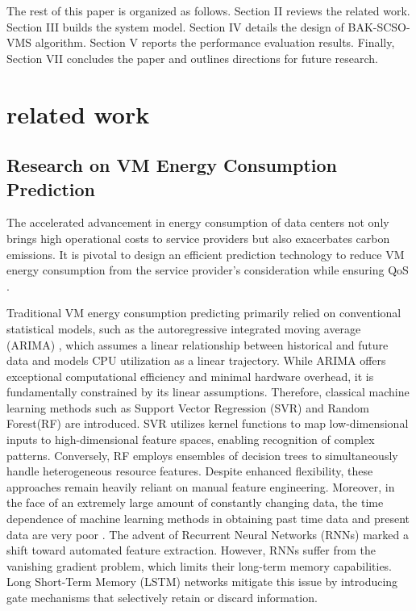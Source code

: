 \documentclass[conference]{{IEEEtran}}
\begin{document}
The rest of this paper is organized as follows. Section II reviews the related work. Section III builds the system model. Section IV details the design of BAK-SCSO-VMS algorithm. Section V reports the performance evaluation results. Finally, Section VII concludes the paper and outlines directions for future research.

\section{related work}
\subsection{Research on VM Energy Consumption Prediction}

The accelerated advancement in energy consumption of data centers not only brings high operational costs to service providers but also exacerbates carbon emissions. It is pivotal to design an efficient prediction technology to reduce VM energy consumption from the service provider’s consideration while ensuring QoS \cite{chua2024building}. 

Traditional VM energy consumption predicting primarily relied on conventional statistical models, such as the autoregressive integrated moving average (ARIMA) \cite{contreras2003arima}, which assumes a linear relationship between historical and future data and models CPU utilization as a linear trajectory. While ARIMA offers exceptional computational efficiency and minimal hardware overhead, it is fundamentally constrained by its linear assumptions. Therefore, classical machine learning methods such as Support Vector Regression (SVR) \cite{bertossi1999fault} and Random Forest(RF) \cite{sheykhmousa2020support} are introduced. SVR utilizes kernel functions to map low-dimensional inputs to high-dimensional feature spaces, enabling recognition of complex patterns. Conversely, RF employs ensembles of decision trees to simultaneously handle heterogeneous resource features. Despite enhanced flexibility, these approaches remain heavily reliant on manual feature engineering. Moreover, in the face of an extremely large amount of constantly changing data, the time dependence of machine learning methods in obtaining past time data and present data are very poor \cite{zhang2021new}. The advent of Recurrent Neural Networks (RNNs) marked a shift toward automated feature extraction. However, RNNs suffer from the vanishing gradient problem, which limits their long-term memory capabilities. Long Short-Term Memory (LSTM) \cite{karim2017lstm} networks mitigate this issue by introducing gate mechanisms that selectively retain or discard information.
\end{document}
